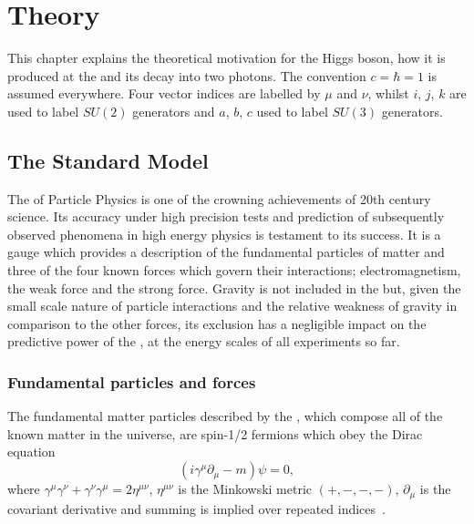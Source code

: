 \chapter{Theory}
\label{chap:theory}

This chapter explains the theoretical motivation for the Higgs boson, how it is produced at the \LHC and its decay into two photons. The convention $c=\hbar=1$ is assumed everywhere. Four vector indices are labelled by $\mu$ and $\nu$, whilst $i$, $j$, $k$ are used to label $SU(2)$ generators and $a$, $b$, $c$ used to label $SU(3)$ generators.

\section{The Standard Model}
\label{sec:standardmodel}

The \SM of Particle Physics is one of the crowning achievements of 20th century science. Its accuracy under high precision tests and prediction of subsequently observed phenomena in high energy physics is testament to its success. It is a gauge \QFT which provides a description of the fundamental particles of matter and three of the four known forces which govern their interactions; electromagnetism, the weak force and the strong force. Gravity is not included in the \SM but, given the small scale nature of particle interactions and the relative weakness of gravity in comparison to the other forces, its exclusion has a negligible impact on the predictive power of the \SM, at the energy scales of all experiments so far.

\subsection{Fundamental particles and forces}

The fundamental matter particles described by the \SM, which compose all of the known matter in the universe, are spin-1/2 fermions which obey the Dirac equation
\begin{equation}
  (i\gamma^{\mu}\partial_{\mu}-m)\psi=0,
  \label{eq:dirac}
\end{equation}
where $\gamma^{\mu}\gamma^{\nu}+\gamma^{\nu}\gamma^{\mu}=2\eta^{\mu\nu}$, $\eta^{\mu\nu}$ is the Minkowski metric $(+,-,-,-)$, $\partial_{\mu}$ is the covariant derivative and summing is implied over repeated indices~\cite{Halzen}.

